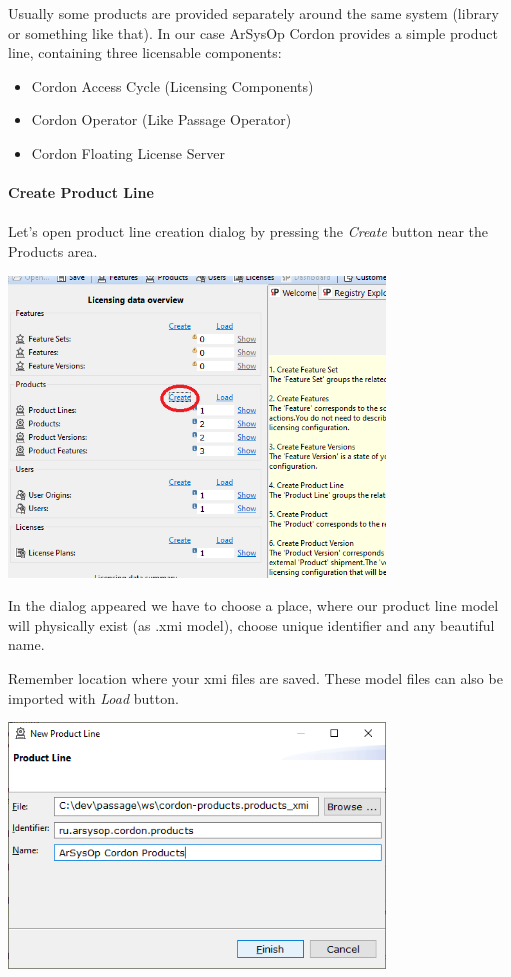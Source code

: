 \documentclass[12pt]{report}
\begin{document}
Usually some products are provided separately around the same system (library or something like that). In our case ArSysOp Cordon provides a simple product line, containing three licensable components:
\begin{itemize}
    \item Cordon Access Cycle (Licensing Components)
    \item Cordon Operator (Like Passage Operator)
    \item Cordon Floating License Server
\end{itemize}

\paragraph*{Create Product Line}
\paragraph*{}

Let's open product line creation dialog by pressing the \textit{Create} button near the Products area.

\begin{center}
    \includegraphics[width=0.75\textwidth]{product_line_create}
\end{center}

In the dialog appeared we have to choose a place, where our product line model will physically exist (as .xmi model), choose unique identifier and any beautiful name.

Remember location where your xmi files are saved. These model files can also be imported with \textit{Load} button.

\begin{center}
    \includegraphics[width=0.75\textwidth]{product_line_dialog}
\end{center}
\end{document}
